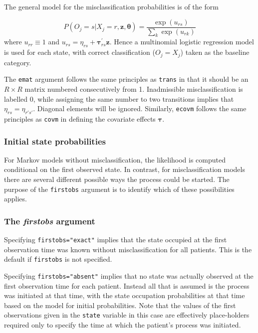 \documentclass{article}
\numberwithin{equation}{section}
\begin{document}
The general model for the misclassification probabilities is of the form

$$P(O_j = s | X_j = r, \mathbf{z}, \bm\theta) = \frac{\exp( u_{rs})}{\sum_{k} \exp(u_{rk})}$$
where $u_{rr} \equiv 1$ and $u_{rs} = \eta_{rs} + \bm\tau_{rs}^{'}\mathbf{z}.$
Hence a multinomial logistic regression model is used for each state, with correct classification ($O_j = X_j$) taken as the baseline category.

The \verb!emat! argument follows the same principles as \verb!trans! in that it should be an $R \times R$ matrix numbered consecutively from 1. Inadmissible misclassification is labelled 0, while assigning the same number to two transitions implies that $\eta_{rs} = \eta_{r's'}$. Diagonal elements will be ignored.
Similarly, \verb!ecovm! follows the same principles as \verb!covm! in defining the covariate effects $\bm\tau$.

\subsubsection{Initial state probabilities}
\label{initprobs}

For Markov models without misclassification, the likelihood is computed conditional on the first observed state. In contrast, for misclassification models there are several different possible ways the process could be started. The purpose of the \verb!firstobs! argument is to identify which of these possibilities applies.

\subsubsection*{The {\it firstobs} argument}

Specifying \verb!firstobs="exact"! implies that the state occupied at the first observation time was known without misclassification for all patients. This is the default if \verb!firstobs! is not specified.

Specifying \verb!firstobs="absent"! implies that no state was actually observed at the first observation time for each patient. Instead all that is assumed is the process was initiated at that time, with the state occupation probabilities at that time based on the model for initial probabilities. Note that the values of the first observations given in the \verb!state! variable in this case are effectively place-holders required only to specify the time at which the patient's process was initiated.
\end{document}
